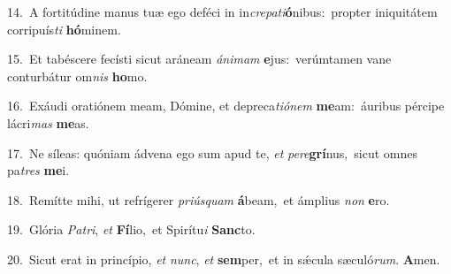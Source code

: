 {\numbfont\textcolor{\numbcolor}{14.}}~A fortitúdine manus tuæ ego deféci in in\-\textit{cre}\-\textit{pa}\textit{ti}\textbf{ó}nibus:~\star propter iniquitátem corripuís\textit{ti} \textbf{hó}\-minem.\par
{\numbfont\textcolor{\numbcolor}{15.}}~Et tabéscere fecísti sicut aráneam \textit{á}\-\textit{ni}\textit{mam} \textbf{e}\-jus:~\star verúmtamen vane conturbátur om\textit{nis} \textbf{ho}\-mo.\par
{\numbfont\textcolor{\numbcolor}{16.}}~Exáudi oratiónem meam, Dómine, et depreca\-\textit{ti}\-\textit{ó}\textit{nem} \textbf{me}\-am:~\star áuribus pércipe lácri\textit{mas} \textbf{me}\-as.\par
{\numbfont\textcolor{\numbcolor}{17.}}~Ne síleas: quóniam ádvena ego sum apud te, \textit{et} \textit{per}\-\textit{e}\textbf{grí}nus,~\star sicut omnes pa\textit{tres} \textbf{me}\-i.\par
{\numbfont\textcolor{\numbcolor}{18.}}~Remítte mihi, ut refrígerer \textit{pri}\-\textit{ús}\textit{quam} \textbf{á}\-beam,~\star et ámplius \textit{non} \textbf{e}\-ro.\par
{\numbfont\textcolor{\numbcolor}{19.}}~Glória \textit{Pa}\-\textit{tri}, \textit{et} \textbf{Fí}\-lio,~\star et Spirítu\textit{i} \textbf{Sanc}\-to.\par
{\numbfont\textcolor{\numbcolor}{20.}}~Sicut erat in princípio, \textit{et} \textit{nunc}\-, \textit{et} \textbf{sem}\-per,~\star et in sǽcula sæculó\-\textit{rum}\-. \textbf{A}\-men.\par
